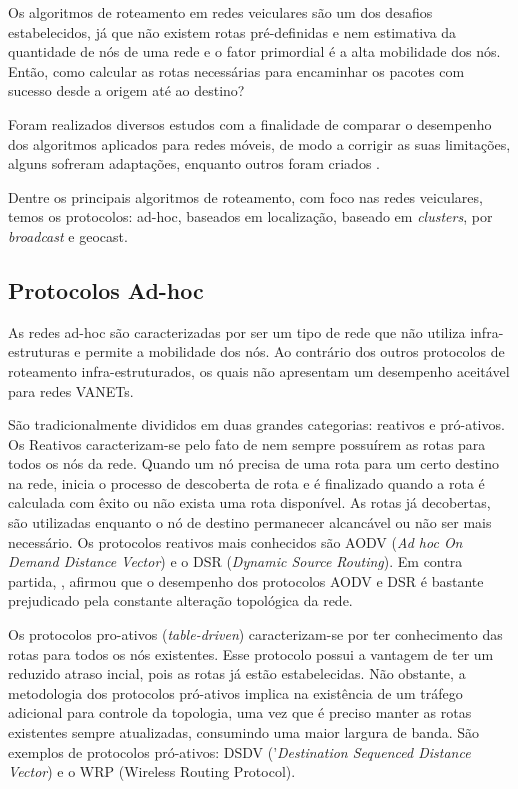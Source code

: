\documentclass[
	12pt,				%
	oneside,			%
	a4paper,			%
	english,			%
	brazil				%
	]{abntex2ppgsi}
\begin{document}
Os algoritmos de roteamento em redes veiculares são um dos desafios estabelecidos, já que não existem rotas pré-definidas e nem estimativa da quantidade de nós de uma rede e o fator primordial é a alta mobilidade dos nós. Então, como calcular as rotas necessárias para encaminhar os pacotes com sucesso desde a origem até ao destino? 

Foram realizados diversos estudos com a finalidade de comparar o desempenho dos algoritmos aplicados para redes móveis, de modo a corrigir as suas limitações, alguns sofreram adaptações, enquanto outros foram criados \cite{luis2009melhoria}.

Dentre os principais algoritmos de roteamento, com foco nas redes veiculares, temos os protocolos: ad-hoc, baseados em localização, baseado em \textit{clusters}, por \textit{broadcast} e geocast.

\subsection{Protocolos Ad-hoc}

As redes ad-hoc são caracterizadas por ser um tipo de rede que não utiliza infra-estruturas e permite a mobilidade dos nós. Ao contrário dos outros protocolos de roteamento infra-estruturados, os quais não apresentam um  desempenho aceitável para redes VANETs.  

São tradicionalmente divididos em duas grandes categorias: reativos e pró-ativos. Os Reativos caracterizam-se pelo fato de nem sempre possuírem as rotas para todos os nós da rede. Quando um nó precisa de uma rota para um certo destino na rede, inicia o processo de descoberta de rota e é finalizado quando a rota é calculada com êxito ou não exista uma rota disponível. As rotas já decobertas, são utilizadas enquanto o nó de destino permanecer alcancável ou não ser mais necessário. Os protocolos reativos mais conhecidos são AODV (\textit{Ad hoc On Demand Distance Vector}) e o DSR (\textit{Dynamic Source Routing}). Em contra partida, , afirmou que o desempenho dos protocolos AODV e DSR é bastante prejudicado pela constante alteração topológica da rede.

Os protocolos pro-ativos (\textit{table-driven}) caracterizam-se por ter conhecimento das rotas para todos os nós existentes. Esse protocolo possui a vantagem de ter um reduzido atraso incial, pois as rotas já estão estabelecidas. Não obstante, a metodologia dos protocolos pró-ativos implica na existência de um tráfego adicional para controle da topologia, uma vez que é preciso manter as rotas existentes sempre atualizadas, consumindo uma maior largura de banda. São exemplos de protocolos pró-ativos: DSDV ('\textit{Destination Sequenced Distance Vector}) e o WRP (Wireless Routing Protocol).
\end{document}
